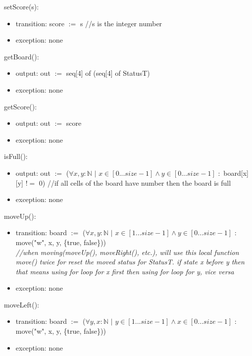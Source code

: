 \documentclass[12pt]{article}
\begin{document}
\noindent setScore(s):
\begin{itemize}
  \item transition: score $:=$ s \quad //s is the integer number
  \item exception: none
\end{itemize}

\noindent getBoard():
\begin{itemize}
  \item output: out $:=$ seq[4] of (seq[4] of StatusT)
  \item exception: none
\end{itemize}

\noindent getScore():
\begin{itemize}
  \item output: out $:=$ score
  \item exception: none
\end{itemize}

\noindent isFull():
\begin{itemize}
  \item output: out $:=$ ($\forall x, y : \mathbb{N}$ $|$ $x \in [0...size - 1] \land y \in [0...size - 1]$ $:$ board[x][y] $!=$ 0) \quad //if all cells of the board have number then the board is full
  \item exception: none
\end{itemize}

\noindent moveUp():
\begin{itemize}
  \item transition: board $:=$ ($\forall x, y : \mathbb{N}$ $|$ $x \in [1...size - 1] \land y \in [0...size - 1]$ $:$ move("w", x, y, \{true, false\})) \\
  \noindent \textit{//when moving(moveUp(), moveRight(), etc.), will use this local function \textit{move()} twice for reset the moved status for StatusT.
                      if state x before y then that means using for loop for x first then using for loop for y, vice versa}
  \item exception: none
\end{itemize}

\noindent moveLeft():
\begin{itemize}
  \item transition: board $:=$ ($\forall y, x : \mathbb{N}$ $|$ $y \in [1...size - 1] \land x \in [0...size - 1]$ $:$ move("w", x, y, \{true, false\}))
  \item exception: none
\end{itemize}
\end{document}
